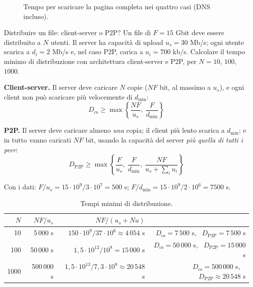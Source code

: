 \begin{figure}[H]
\centering
{}
\caption{Tempo per scaricare la pagina completa nei quattro casi (DNS incluso).}
\end{figure}

\begin{esercizio}{Distribuire un file: client-server o P2P?}
Un file di $F = 15$ Gbit deve essere distribuito a $N$ utenti. Il server ha capacità di upload $u_s = 30$ Mb/s; ogni utente
scarica a $d_i = 2$ Mb/s e, nel caso P2P, carica a $u_i = 700$ kb/s. Calcolare il tempo minimo di distribuzione con
architettura client-server e P2P, per $N = 10$, $100$, $1000$.
\end{esercizio}

\svolgimento
\textbf{Client-server.} Il server deve caricare $N$ copie ($N F$ bit, al massimo a $u_s$), e ogni client non può scaricare più
velocemente di $d_{\min}$:
$$D_{\text{cs}} \ge \max\left\{ \frac{N F}{u_s},\ \frac{F}{d_{\min}} \right\}$$

\textbf{P2P.} Il server deve caricare almeno \emph{una} copia; il client più lento scarica a $d_{\min}$; e in tutto vanno caricati
$N F$ bit, usando la capacità del server \emph{più quella di tutti i peer}:
$$D_{\text{P2P}} \ge \max\left\{ \frac{F}{u_s},\ \frac{F}{d_{\min}},\ \frac{N F}{u_s + \sum_i u_i} \right\}$$

Con i dati: $F/u_s = 15\cdot 10^9 / 3\cdot 10^7 = 500$ s; $F/d_{\min} = 15\cdot 10^9 / 2 \cdot 10^6 = 7500$ s.

\begin{table}[H]
\centering
\begin{tabular}{rrrr}
\toprule
$N$ & $N F / u_s$ & $N F / (u_s + N u)$ & \\
\midrule
10 & 5\,000 s & $150\cdot 10^9 / 37\cdot 10^6 \approx 4\,054$ s & $D_{\text{cs}} = 7\,500$ s, \ $D_{\text{P2P}} = 7\,500$ s \\
100 & 50\,000 s & $1{,}5\cdot 10^{12} / 10^8 = 15\,000$ s & $D_{\text{cs}} = 50\,000$ s, \ $D_{\text{P2P}} = 15\,000$ s \\
1000 & 500\,000 s & $1{,}5\cdot 10^{13} / 7{,}3\cdot 10^8 \approx 20\,548$ s & $D_{\text{cs}} = 500\,000$ s, \ $D_{\text{P2P}} \approx 20\,548$ s \\
\bottomrule
\end{tabular}
\caption{Tempi minimi di distribuzione.}
\end{table}

